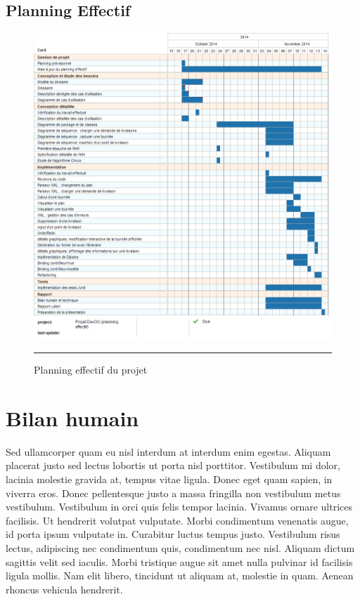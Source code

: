 \subsection{Planning Effectif}
\begin{figure}[htbp]
	\centering
		\includegraphics[width=\textwidth,height=\textheight,keepaspectratio]{Figures/effective_plan}
		\rule{35em}{0.5pt}
	\caption[Planning effectif du projet]{Planning effectif du projet}
\end{figure}
\clearpage


\section{Bilan humain}

Sed ullamcorper quam eu nisl interdum at interdum enim egestas. Aliquam placerat justo sed lectus lobortis ut porta nisl porttitor. Vestibulum mi dolor, lacinia molestie gravida at, tempus vitae ligula. Donec eget quam sapien, in viverra eros. Donec pellentesque justo a massa fringilla non vestibulum metus vestibulum. Vestibulum in orci quis felis tempor lacinia. Vivamus ornare ultrices facilisis. Ut hendrerit volutpat vulputate. Morbi condimentum venenatis augue, id porta ipsum vulputate in. Curabitur luctus tempus justo. Vestibulum risus lectus, adipiscing nec condimentum quis, condimentum nec nisl. Aliquam dictum sagittis velit sed iaculis. Morbi tristique augue sit amet nulla pulvinar id facilisis ligula mollis. Nam elit libero, tincidunt ut aliquam at, molestie in quam. Aenean rhoncus vehicula hendrerit.


